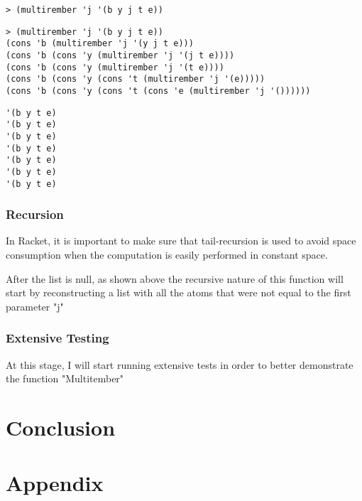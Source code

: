 \documentclass{article}
\begin{document}
\begin{lstlisting}
> (multirember 'j '(b y j t e))
\end{lstlisting}

\begin{lstlisting}
> (multirember 'j '(b y j t e))
(cons 'b (multirember 'j '(y j t e)))
(cons 'b (cons 'y (multirember 'j '(j t e))))
(cons 'b (cons 'y (multirember 'j '(t e))))
(cons 'b (cons 'y (cons 't (multirember 'j '(e)))))
(cons 'b (cons 'y (cons 't (cons 'e (multirember 'j '())))))
\end{lstlisting}

\begin{lstlisting}
'(b y t e)
'(b y t e)
'(b y t e)
'(b y t e)
'(b y t e)
'(b y t e)
'(b y t e)
\end{lstlisting}

\subsubsection{Recursion}
In Racket, it is important to make sure that tail-recursion is used to avoid space consumption when the computation is easily performed in constant space.

After the list is null, as shown above the recursive nature of this function will start by reconstructing a list with all the atoms that were not equal to the first parameter "j"

\subsubsection{Extensive Testing}
At this stage, I will start running extensive tests in order to better demonstrate the function "Multitember"


\newpage
\section{Conclusion}\label{sec:conclusion}

\newpage
\section{Appendix}\label{sec:appendix}
\end{document}
